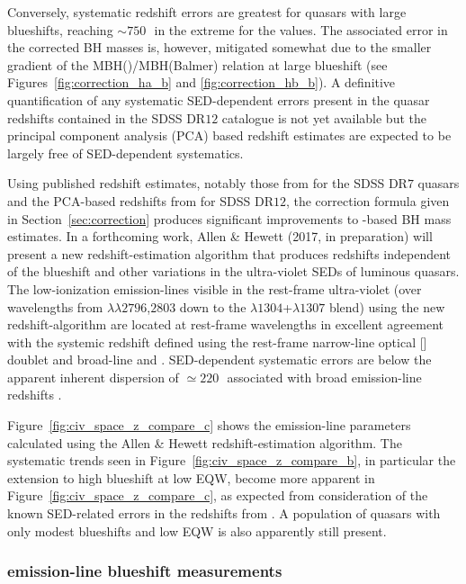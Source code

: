 Conversely, systematic redshift errors are greatest for quasars with large blueshifts, reaching $\sim750$\,\kms\, in the extreme for the \citet{hewett10} values.
The associated error in the corrected  BH masses is, however, mitigated somewhat due to the smaller gradient of the MBH()/MBH(Balmer) relation at large  blueshift (see Figures~\ref{fig:correction_ha_b} and \ref{fig:correction_hb_b}).
A definitive quantification of any systematic SED-dependent errors present in the quasar redshifts contained in the SDSS DR$12$ catalogue is not yet available but the principal component analysis (PCA) based redshift estimates are expected to be largely free of SED-dependent systematics.

Using published redshift estimates, notably those from \citet{hewett10} for the SDSS DR$7$ quasars and the PCA-based redshifts from \citet{paris17} for SDSS DR$12$, the correction formula given in Section~\ref{sec:correction} produces significant improvements to -based BH mass estimates.
In a forthcoming work, Allen \& Hewett (2017, in preparation) will present a new redshift-estimation algorithm that produces redshifts independent of the  blueshift and other variations in the ultra-violet SEDs of luminous quasars.
The low-ionization emission-lines visible in the rest-frame ultra-violet (over wavelengths from $\lambda\lambda$$2796$,$2803$ down to the $\lambda$$1304$+$\lambda$$1307$ blend) using the new redshift-algorithm are located at rest-frame wavelengths in excellent agreement with the systemic redshift defined using the rest-frame narrow-line optical [] doublet and broad-line \hb and \hans.
SED-dependent systematic errors are below the apparent inherent dispersion of $\simeq220$\,\kms\, associated with broad emission-line redshifts \citep{shen16b}.

Figure~\ref{fig:civ_space_z_compare_c} shows the  emission-line parameters calculated using the Allen \& Hewett redshift-estimation algorithm.
The systematic trends seen in Figure~\ref{fig:civ_space_z_compare_b}, in particular the extension to high blueshift at low  EQW, become more apparent in Figure~\ref{fig:civ_space_z_compare_c}, as expected from consideration of the known SED-related errors in the redshifts from \citet{hewett10}.
A population of quasars with only modest blueshifts and low EQW is also apparently still present.

\subsubsection{ emission-line blueshift measurements}
\label{sec:ch3-civmeasure}

